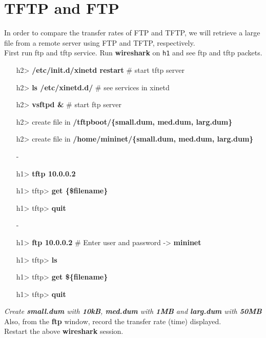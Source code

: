 \documentclass[10pt,a4paper]{article}
\numberwithin{equation}{section}
\numberwithin{figure}{section}
\numberwithin{table}{section}
\begin{document}



\section{TFTP and FTP}
In order to compare the transfer rates of FTP and TFTP, we will retrieve a large file from a remote server using FTP and TFTP, respectively.\\
First run ftp and tftp service. Run \textbf{wireshark} on \texttt{h1} and see ftp and tftp packets. \\
\begin{itemize}
	\item [h2>] \textbf{/etc/init.d/xinetd restart} \# start tftp server
	\item [h2>] \textbf{ls /etc/xinetd.d/} \# see services in xinetd
	\item [h2>] \textbf{vsftpd \& }\# start ftp server
	\item [h2>] create file in \textbf{/tftpboot/\{small.dum, med.dum, larg.dum\}}
	\item [h2>] create file in \textbf{/home/mininet/\{small.dum, med.dum, larg.dum\}}
	\item [-]
	\item [h1>] \textbf{tftp 10.0.0.2}
	\item [h1>] tftp> \textbf{get \{\$filename\}}
	\item [h1>] tftp> \textbf{quit}
	\item [-]
	\item [h1>] \textbf{ftp 10.0.0.2} \# Enter user and password -> \textbf{mininet}
	\item [h1>] tftp> \textbf{ls}
	\item [h1>] tftp> \textbf{get \$\{filename\}}
	\item [h1>] tftp> \textbf{quit}
\end{itemize}
\textit{Create \textbf{small.dum} with \textbf{10kB}, \textbf{med.dum} with \textbf{1MB} and \textbf{larg.dum} with \textbf{50MB}} \\
Also, from the \textbf{ftp} window, record the transfer rate (time) displayed. \\
Restart the above \textbf{wireshark} session.
\end{document}
